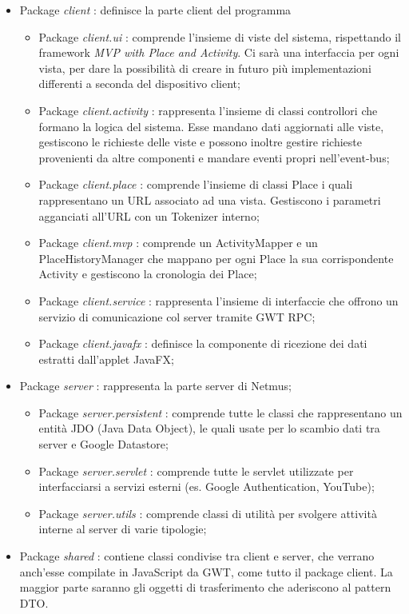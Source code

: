 \begin{itemize}
  \item Package \emph{client} : definisce la parte client del programma
  \begin {itemize}
    \item Package \emph{client.ui} : comprende l'insieme di viste del sistema,
    rispettando il framework \emph{MVP with Place and Activity}. Ci sar\`a una
    interfaccia per ogni vista, per dare la possibilit\`a di creare in futuro
    pi\`u implementazioni differenti a seconda del dispositivo client;
    \item Package \emph{client.activity} : rappresenta l'insieme di classi
    controllori che formano la logica del sistema. Esse mandano dati aggiornati alle
    viste, gestiscono le richieste delle viste e possono inoltre gestire
    richieste provenienti da altre componenti e mandare eventi propri nell'event-bus;
    \item Package \emph{client.place} : comprende l'insieme di classi Place i
    quali rappresentano un URL associato ad una vista. Gestiscono i parametri
    agganciati all'URL con un Tokenizer interno;
    \item Package \emph{client.mvp} : comprende un ActivityMapper e
    un PlaceHistoryManager che mappano per ogni Place la sua corrispondente
    Activity e gestiscono la cronologia dei Place;
    \item Package \emph{client.service} : rappresenta l'insieme di interfaccie
    che offrono un servizio di comunicazione col server tramite GWT RPC;
    \item Package \emph{client.javafx} : definisce la componente di
    ricezione dei dati estratti dall'applet JavaFX;
  \end {itemize}
  \item Package \emph{server} : rappresenta la parte server di Netmus;
  \begin{itemize}
    \item Package \emph{server.persistent} : comprende tutte le classi che
    rappresentano un entit\`a JDO (Java Data Object), le quali usate per lo scambio dati tra
    server e Google Datastore;
    \item Package \emph{server.servlet} : comprende tutte le servlet utilizzate
    per interfacciarsi a servizi esterni (es. Google Authentication, YouTube);
    \item Package \emph{server.utils} : comprende classi di utilit\`a per
    svolgere attivit\`a interne al server di varie tipologie;
  \end{itemize}
  \item Package \emph{shared} :  contiene classi condivise tra client e server,
  che verrano anch'esse compilate in JavaScript da GWT, come tutto il package
  client. La maggior parte saranno gli oggetti di trasferimento che
  aderiscono al pattern DTO.
\end{itemize}

